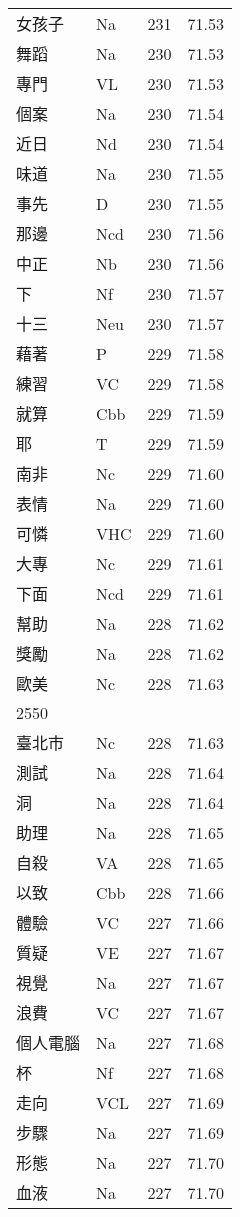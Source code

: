 \documentclass[twocolumn]{book}
\begin{document}
\begin{supertabular}{llrr}
女孩子 & Na & 231 &  71.53\\
舞蹈 & Na & 230 &  71.53\\
專門 & VL & 230 &  71.53\\
個案 & Na & 230 &  71.54\\
近日 & Nd & 230 &  71.54\\
味道 & Na & 230 &  71.55\\
事先 & D & 230 &  71.55\\
那邊 & Ncd & 230 &  71.56\\
中正 & Nb & 230 &  71.56\\
下 & Nf & 230 &  71.57\\
十三 & Neu & 230 &  71.57\\
藉著 & P & 229 &  71.58\\
練習 & VC & 229 &  71.58\\
就算 & Cbb & 229 &  71.59\\
耶 & T & 229 &  71.59\\
南非 & Nc & 229 &  71.60\\
表情 & Na & 229 &  71.60\\
可憐 & VHC & 229 &  71.60\\
大專 & Nc & 229 &  71.61\\
下面 & Ncd & 229 &  71.61\\
幫助 & Na & 228 &  71.62\\
獎勵 & Na & 228 &  71.62\\
歐美 & Nc & 228 &  71.63\\
2550\\
臺北市 & Nc & 228 &  71.63\\
測試 & Na & 228 &  71.64\\
洞 & Na & 228 &  71.64\\
助理 & Na & 228 &  71.65\\
自殺 & VA & 228 &  71.65\\
以致 & Cbb & 228 &  71.66\\
體驗 & VC & 227 &  71.66\\
質疑 & VE & 227 &  71.67\\
視覺 & Na & 227 &  71.67\\
浪費 & VC & 227 &  71.67\\
個人電腦 & Na & 227 &  71.68\\
杯 & Nf & 227 &  71.68\\
走向 & VCL & 227 &  71.69\\
步驟 & Na & 227 &  71.69\\
形態 & Na & 227 &  71.70\\
血液 & Na & 227 &  71.70\\

\end{supertabular}
\end{document}
